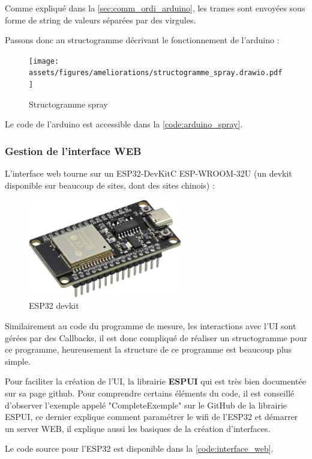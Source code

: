 Comme expliqué dans la \autoref{sec:comm_ordi_arduino}, les trames sont envoyées sous forme de string de valeurs séparées par des virgules.

Passons donc au structogramme décrivant le fonctionnement de l'arduino :
\begin{figure}[H]
    \centering
    \texttt{[image: assets/figures/ameliorations/structogramme\_spray.drawio.pdf]}
    \caption{Structogramme spray}
\end{figure}
Le code de l'arduino est accessible dans la \autoref{code:arduino_spray}.

\newpage
\subsubsection{Gestion de l'interface WEB}
L'interface web tourne sur un ESP32-DevKitC ESP-WROOM-32U (un devkit disponible sur beaucoup de sites, dont des sites chinois) :
\begin{figure}[H]
    \centering
    \includegraphics[page = 1, width = 0.6\textwidth]{assets/figures/ameliorations/ESP32_devkit.jpg}
    \caption{ESP32 devkit}
\end{figure}

Similairement au code du programme de mesure, les interactions avec l'UI sont gérées par des Callbacks, il est donc compliqué de réaliser un structogramme pour ce programme, heureusement la structure de ce programme est beaucoup
plus simple.

Pour faciliter la création de l'UI, la librairie \textbf{ESPUI}\cite{ESPUI}\footnotemark{} qui est très bien
documentée sur sa page github. Pour comprendre certains éléments du code, il est conseillé d'observer l'exemple appelé "CompleteExemple" sur le GitHub de la librairie ESPUI, ce dernier explique comment paramétrer le wifi de l'ESP32 et démarrer
un server WEB, il explique aussi les basiques de la création d'interfaces.

Le code source pour l'ESP32 est disponible dans la \autoref{code:interface_web}.

